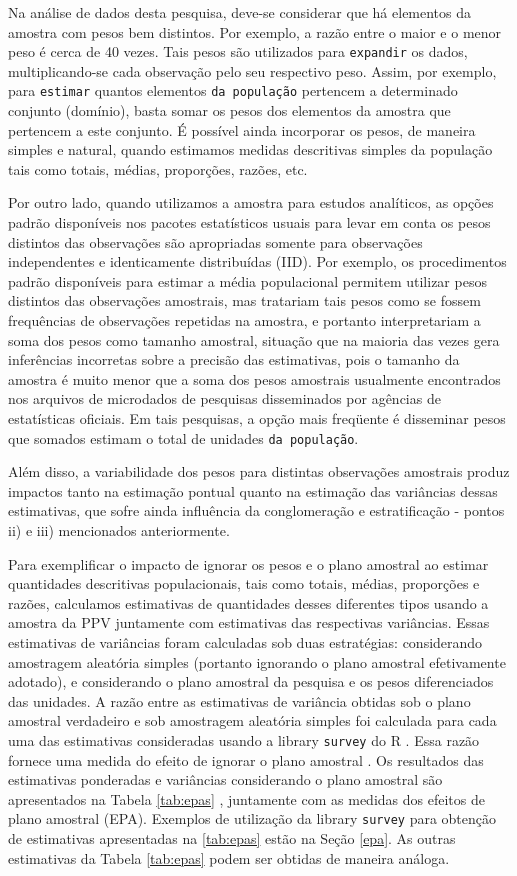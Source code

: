 \documentclass[]{book}
\theoremstyle{definition}
\theoremstyle{definition}
\theoremstyle{definition}
\theoremstyle{remark}
\begin{document}
Na análise de dados desta pesquisa, deve-se considerar que há elementos
da amostra com pesos bem distintos. Por exemplo, a razão entre o maior e
o menor peso é cerca de 40 vezes. Tais pesos são utilizados para
\texttt{expandir} os dados, multiplicando-se cada observação pelo seu
respectivo peso. Assim, por exemplo, para \texttt{estimar} quantos
elementos \texttt{da\ população} pertencem a determinado conjunto
(domínio), basta somar os pesos dos elementos da amostra que pertencem a
este conjunto. É possível ainda incorporar os pesos, de maneira simples
e natural, quando estimamos medidas descritivas simples da população
tais como totais, médias, proporções, razões, etc.

Por outro lado, quando utilizamos a amostra para estudos analíticos, as
opções padrão disponíveis nos pacotes estatísticos usuais para levar em
conta os pesos distintos das observações são apropriadas somente para
observações independentes e identicamente distribuídas (IID). Por
exemplo, os procedimentos padrão disponíveis para estimar a média
populacional permitem utilizar pesos distintos das observações
amostrais, mas tratariam tais pesos como se fossem frequências de
observações repetidas na amostra, e portanto interpretariam a soma dos
pesos como tamanho amostral, situação que na maioria das vezes gera
inferências incorretas sobre a precisão das estimativas, pois o tamanho
da amostra é muito menor que a soma dos pesos amostrais usualmente
encontrados nos arquivos de microdados de pesquisas disseminados por
agências de estatísticas oficiais. Em tais pesquisas, a opção mais
freqüente é disseminar pesos que somados estimam o total de unidades
\texttt{da\ população}.

Além disso, a variabilidade dos pesos para distintas observações
amostrais produz impactos tanto na estimação pontual quanto na estimação
das variâncias dessas estimativas, que sofre ainda influência da
conglomeração e estratificação - pontos ii) e iii) mencionados
anteriormente.

Para exemplificar o impacto de ignorar os pesos e o plano amostral ao
estimar quantidades descritivas populacionais, tais como totais, médias,
proporções e razões, calculamos estimativas de quantidades desses
diferentes tipos usando a amostra da PPV juntamente com estimativas das
respectivas variâncias. Essas estimativas de variâncias foram calculadas
sob duas estratégias: considerando amostragem aleatória simples
(portanto ignorando o plano amostral efetivamente adotado), e
considerando o plano amostral da pesquisa e os pesos diferenciados das
unidades. A razão entre as estimativas de variância obtidas sob o plano
amostral verdadeiro e sob amostragem aleatória simples foi calculada
para cada uma das estimativas consideradas usando a library
\texttt{survey} do R \citep{R-survey} . Essa razão fornece uma medida do
efeito de ignorar o plano amostral . Os resultados das estimativas
ponderadas e variâncias considerando o plano amostral são apresentados
na Tabela \ref{tab:epas} , juntamente com as medidas dos efeitos de
plano amostral (EPA). Exemplos de utilização da library \texttt{survey}
para obtenção de estimativas apresentadas na \ref{tab:epas} estão na
Seção \ref{epa}. As outras estimativas da Tabela \ref{tab:epas} podem
ser obtidas de maneira análoga.
\end{document}

